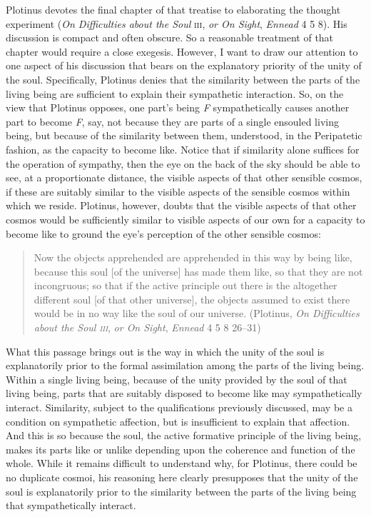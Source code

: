 Plotinus devotes the final chapter of that treatise to elaborating the thought experiment (\emph{On Difficulties about the Soul} \textsc{iii}, \emph{or On Sight}, \emph{Ennead} 4 5 8). His discussion is compact and often obscure. So a reasonable treatment of that chapter would require a close exegesis. However, I want to draw our attention to one aspect of his discussion that bears on the explanatory priority of the unity of the soul. Specifically, Plotinus denies that the similarity between the parts of the living being are sufficient to explain their sympathetic interaction. So, on the view that Plotinus opposes, one part's being \emph{F} sympathetically causes another part to become \emph{F}, say, not because they are parts of a single ensouled living being, but because of the similarity between them, understood, in the Peripatetic fashion, as the capacity to become like. Notice that if similarity alone suffices for the operation of sympathy, then the eye on the back of the sky should be able to see, at a proportionate distance, the visible aspects of that other sensible cosmos, if these are suitably similar to the visible aspects of the sensible cosmos within which we reside. Plotinus, however, doubts that the visible aspects of that other cosmos would be sufficiently similar to visible aspects of our own for a capacity to become like to ground the eye's perception of the other sensible cosmos:
\begin{quote}
	Now the objects apprehended are apprehended in this way by being like, because this soul [of the universe] has made them like, so that they are not incongruous; so that if the active principle out there is the altogether different soul [of that other universe], the objects assumed to exist there would be in no way like the soul of our universe. (Plotinus, \emph{On Difficulties about the Soul \textsc{iii}}, \emph{or On Sight}, \emph{Ennead} 4 5 8 26--31)
\end{quote}
What this passage brings out is the way in which the unity of the soul is explanatorily prior to the formal assimilation among the parts of the living being. Within a single living being, because of the unity provided by the soul of that living being, parts that are suitably disposed to become like may sympathetically interact. Similarity, subject to the qualifications previously discussed, may be a condition on sympathetic affection, but is insufficient to explain that affection. And this is so because the soul, the active formative principle of the living being, makes its parts like or unlike depending upon the coherence and function of the whole. While it remains difficult to understand why, for Plotinus, there could be no duplicate cosmoi, his reasoning here clearly presupposes that the unity of the soul is explanatorily prior to the similarity between the parts of the living being that sympathetically interact.

